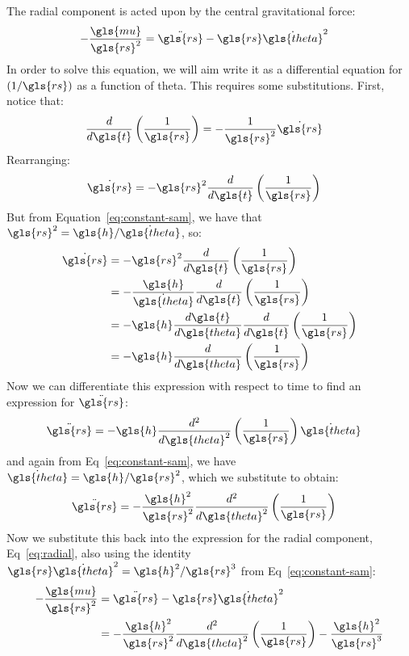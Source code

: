 \documentclass[12pt,openany]{book}
\begin{document}
The radial component is acted upon by the central gravitational force:
\begin{align}
  -\frac{\gls{mu}}{\gls{rs}^2}
  &= \ddot{\gls{rs}} - \gls{rs}\dot{\gls{theta}}^2 \label{eq:radial}
\end{align}
In order to solve this equation, we will aim write it as a differential equation for \((1/\gls{rs})\) as a function of \gls{theta}. This requires some substitutions. First, notice that:
\begin{align}
  \frac{d}{d\gls{t}}\left(\frac{1}{\gls{rs}}\right)
  &= -\frac{1}{\gls{rs}^2}\dot{\gls{rs}}
\end{align}
Rearranging:
\begin{align}
  \dot{\gls{rs}} &= -\gls{rs}^2\frac{d}{d\gls{t}}\left(\frac{1}{\gls{rs}}\right)
\end{align}
But from Equation~\ref{eq:constant-sam}, we have that \(\gls{rs}^2 = \gls{h}/\dot{\gls{theta}}\), so:
\begin{align}
  \dot{\gls{rs}}
  &= -\gls{rs}^2\frac{d}{d\gls{t}}\left(\frac{1}{\gls{rs}}\right) \\
  &= -\frac{\gls{h}}{\dot{\gls{theta}}}\frac{d}{d\gls{t}}\left(\frac{1}{\gls{rs}}\right) \\
  &= -\gls{h}\frac{d\gls{t}}{d\gls{theta}}\frac{d}{d\gls{t}}\left(\frac{1}{\gls{rs}}\right) \\
  &= -\gls{h}\frac{d}{d\gls{theta}}\left(\frac{1}{\gls{rs}}\right)
\end{align}
Now we can differentiate this expression with respect to time to find an expression for \(\ddot{\gls{rs}}\):
\begin{align}
  \ddot{\gls{rs}}
  &= -\gls{h}\frac{d^2}{d\gls{theta}^2}\left(\frac{1}{\gls{rs}}\right)\dot{\gls{theta}}
\end{align}
and again from Eq~\ref{eq:constant-sam}, we have \(\dot{\gls{theta}} = \gls{h}/\gls{rs}^2\), which we substitute to obtain:
\begin{align}
  \ddot{\gls{rs}}
  &= -\frac{\gls{h}^2}{\gls{rs}^2}\frac{d^2}{d\gls{theta}^2}\left(\frac{1}{\gls{rs}}\right)
\end{align}
Now we substitute this back into the expression for the radial component, Eq~\ref{eq:radial}, also using the identity \(\gls{rs}\dot{\gls{theta}}^2 = \gls{h}^2/\gls{rs}^3\) from Eq~\ref{eq:constant-sam}:
\begin{align}
  -\frac{\gls{mu}}{\gls{rs}^2}
  &= \ddot{\gls{rs}} - \gls{rs}\dot{\gls{theta}}^2 \\
  &= -\frac{\gls{h}^2}{\gls{rs}^2}\frac{d^2}{d\gls{theta}^2}\left(\frac{1}{\gls{rs}}\right)
     -\frac{\gls{h}^2}{\gls{rs}^3}
\end{align}
\end{document}
